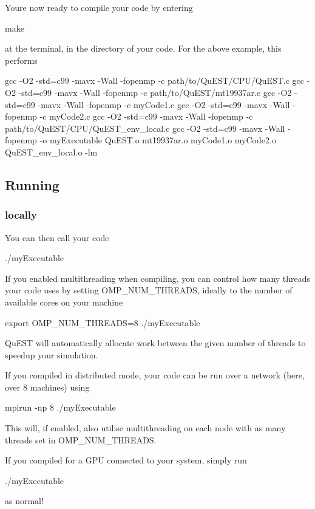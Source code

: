 You\textquotesingle{}re now ready to compile your code by entering 
\begin{DoxyCode}
make
\end{DoxyCode}
 at the terminal, in the directory of your code. For the above example, this performs 
\begin{DoxyCode}
gcc -O2 -std=c99 -mavx -Wall -fopenmp -c path/to/QuEST/CPU/QuEST.c
gcc -O2 -std=c99 -mavx -Wall -fopenmp -c path/to/QuEST/mt19937ar.c
gcc -O2 -std=c99 -mavx -Wall -fopenmp -c myCode1.c
gcc -O2 -std=c99 -mavx -Wall -fopenmp -c myCode2.c
gcc -O2 -std=c99 -mavx -Wall -fopenmp -c path/to/QuEST/CPU/QuEST\_env\_local.c
gcc -O2 -std=c99 -mavx -Wall -fopenmp -o myExecutable QuEST.o mt19937ar.o myCode1.o myCode2.o
       QuEST\_env\_local.o -lm
\end{DoxyCode}
 



\subsection*{Running}

\subsubsection*{locally}

You can then call your code 
\begin{DoxyCode}
./myExecutable
\end{DoxyCode}
 If you enabled multithreading when compiling, you can control how many threads your code uses by setting {\ttfamily O\+M\+P\+\_\+\+N\+U\+M\+\_\+\+T\+H\+R\+E\+A\+DS}, ideally to the number of available cores on your machine 
\begin{DoxyCode}
export OMP\_NUM\_THREADS=8
./myExecutable
\end{DoxyCode}
 Qu\+E\+ST will automatically allocate work between the given number of threads to speedup your simulation.

If you compiled in distributed mode, your code can be run over a network (here, over 8 machines) using 
\begin{DoxyCode}
mpirun -np 8 ./myExecutable
\end{DoxyCode}
 This will, if enabled, also utilise multithreading on each node with as many threads set in {\ttfamily O\+M\+P\+\_\+\+N\+U\+M\+\_\+\+T\+H\+R\+E\+A\+DS}.

If you compiled for a G\+PU connected to your system, simply run 
\begin{DoxyCode}
./myExecutable
\end{DoxyCode}
 as normal!


